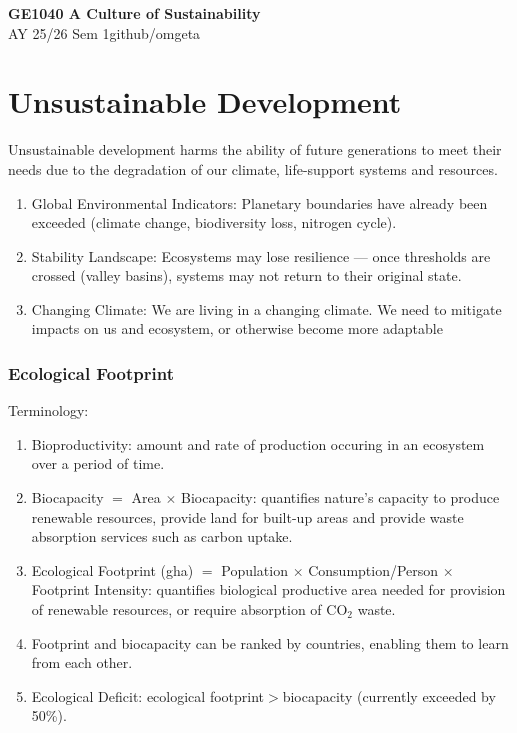 \documentclass[12pt, a4paper]{article}
\newcommand{\mytitle}{GE1040 A Culture of Sustainability}
\newcommand{\myauthor}{github/omgeta}
\newcommand{\mydate}{AY 25/26 Sem 1}
\begin{document}
\raggedright
\footnotesize
\begin{multicols*}{3}
\setlength{\premulticols}{1pt}
\setlength{\postmulticols}{1pt}
\setlength{\multicolsep}{1pt}
\setlength{\columnsep}{2pt}

{\normalsize{\textbf{\mytitle}}} \\
{\footnotesize{\mydate\hspace{2pt}\textemdash\hspace{2pt}\myauthor}}
\vspace{-0.5em}
\section{Unsustainable Development}
Unsustainable development harms the ability of future generations to meet their needs due to the degradation of our climate, life-support systems and resources.
\begin{enumerate}[\roman*.]
  \item Global Environmental Indicators: Planetary boundaries have already been exceeded (climate change, biodiversity loss, nitrogen cycle).
  \item Stability Landscape: Ecosystems may lose resilience — once thresholds are crossed (valley basins), systems may not return to their original state.
  \item Changing Climate: We are living in a changing climate. We need to mitigate impacts on us and ecosystem, or otherwise become more adaptable
\end{enumerate}

\subsubsection{Ecological Footprint}

Terminology:
\begin{enumerate}[\roman*.]
  \item Bioproductivity: amount and rate of production occuring in an ecosystem over a period of time.
  \item Biocapacity $=$ Area $\times$ Biocapacity: quantifies nature's capacity to produce renewable resources, provide land for built-up areas and provide waste absorption services such as carbon uptake.
  \item Ecological Footprint (gha) $=$ Population $\times$ Consumption/Person $\times$ Footprint Intensity: quantifies biological productive area needed for provision of renewable resources, or require absorption of $\text{CO}_2$ waste.
  \item Footprint and biocapacity can be ranked by countries, enabling them to learn from each other. 
  \item Ecological Deficit: ecological footprint$>$biocapacity (currently exceeded by 50\%).
\end{enumerate}


\end{multicols*}
\end{document}
